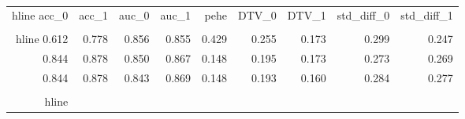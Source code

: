 \begin{table}[h]
\centering
\caption{}
\label{wd_para_4.0_wd_126.32049560546875}
\begin{tabular}{rrrrrrrrr}
\\hline
 acc\_0 &  acc\_1 &  auc\_0 &  auc\_1 &  pehe &  DTV\_0 &  DTV\_1 &  std\_diff\_0 &  std\_diff\_1 \\
\\hline
 0.612 &  0.778 &  0.856 &  0.855 & 0.429 &  0.255 &  0.173 &       0.299 &       0.247 \\
 0.844 &  0.878 &  0.850 &  0.867 & 0.148 &  0.195 &  0.173 &       0.273 &       0.269 \\
 0.844 &  0.878 &  0.843 &  0.869 & 0.148 &  0.193 &  0.160 &       0.284 &       0.277 \\
\\hline
\end{tabular}
\end{table}
